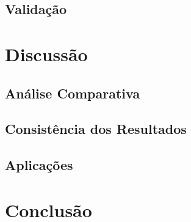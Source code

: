 \documentclass[openright]{normas-utf-tex} %
\begin{document}
	\section{Validação} \label{validation}

			

\chapter{Discussão}

	

	\section{Análise Comparativa}\label{analisecomparativa}

		\label{analisecomparativa}

		
		
		
		
		
	
		
	
		
	
		
		
		
		
		
		

	\section{Consistência dos Resultados}\label{constresult}

		

	\section{Aplicações}\label{application}
		
		



\label{chap:anacomp}

\chapter{Conclusão}
\label{chpa:conc}
	
\end{document}
